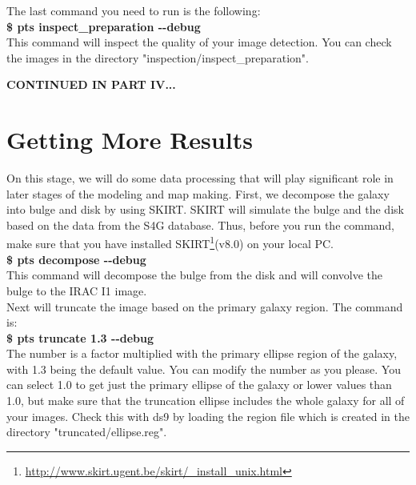 \documentclass[15pt,a4paper,oneside,openright]{report}
\begin{document}
The last command you need to run is the following:\\

\textbf{\$ pts inspect\_preparation -{}-debug}\\

This command will inspect the quality of your image detection. You can check the images in the directory "inspection/inspect\_preparation".\\

\begin{center}
\textbf{CONTINUED IN PART IV...}
\end{center}

\part{Getting More Results}

On this stage, we will do some data processing that will play significant role in later stages of the modeling and map making. First, we decompose the galaxy 
into bulge and disk by using SKIRT. SKIRT will simulate the bulge and the disk based on the data from the S4G database. Thus, before you run the command, make sure that you have installed SKIRT\footnote{\href{http://www.skirt.ugent.be/skirt/\_install\_unix.html}{http://www.skirt.ugent.be/skirt/\_install\_unix.html}}(v8.0) on your local PC.\\

\textbf{\$ pts decompose -{}-debug}\\ 

This command will decompose the bulge from the disk and will convolve the bulge to the IRAC I1 image.\\

Next will truncate the image based on the primary galaxy region. The command is:\\

\textbf{\$ pts truncate 1.3 -{}-debug}\\ 

The number is a factor multiplied with the primary ellipse region of the galaxy, with 1.3 being the default value. You can modify
the number as you please. You can select 1.0 to get just the primary ellipse of the galaxy or lower values than 1.0, but make sure that the truncation ellipse includes the whole galaxy for all of your images. Check this with ds9 by loading the region file which is created in the directory "truncated/ellipse.reg".
\end{document}
